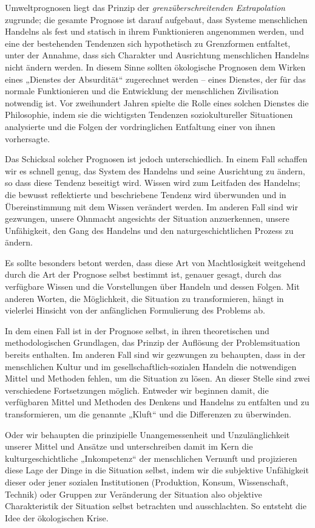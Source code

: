 \documentclass[11pt,a4paper]{article}
\begin{document}
Umweltprognosen liegt das Prinzip der \emph{grenzüberschreitenden
  Extrapolation} zugrunde; die gesamte Prognose ist darauf aufgebaut, dass
Systeme menschlichen Handelns als fest und statisch in ihrem Funktionieren
angenommen werden, und eine der bestehenden Tendenzen sich hypothetisch zu
Grenzformen entfaltet, unter der Annahme, dass sich Charakter und Ausrichtung
menschlichen Handelns nicht ändern werden. In diesem Sinne sollten ökologische
Prognosen dem Wirken eines „Dienstes der Absurdität“ zugerechnet werden --
eines Dienstes, der für das normale Funktionieren und die Entwicklung der
menschlichen Zivilisation notwendig ist. Vor zweihundert Jahren spielte die
Rolle eines solchen Dienstes die Philosophie, indem sie die wichtigsten
Tendenzen soziokultureller Situationen analysierte und die Folgen der
vordringlichen Entfaltung einer von ihnen vorhersagte.

Das Schicksal solcher Prognosen ist jedoch unterschiedlich. In einem Fall
schaffen wir es schnell genug, das System des Handelns und seine Ausrichtung
zu ändern, so dass diese Tendenz beseitigt wird. Wissen wird zum Leitfaden des
Handelns; die bewusst reflektierte und beschriebene Tendenz wird überwunden
und in Übereinstimmung mit dem Wissen verändert werden. Im anderen Fall sind
wir gezwungen, unsere Ohnmacht angesichts der Situation anzuerkennen, unsere
Unfähigkeit, den Gang des Handelns und den naturgeschichtlichen Prozess zu
ändern.

Es sollte besonders betont werden, dass diese Art von Machtlosigkeit
weitgehend durch die Art der Prognose selbst bestimmt ist, genauer gesagt,
durch das verfügbare Wissen und die Vorstellungen über Handeln und dessen
Folgen. Mit anderen Worten, die Möglichkeit, die Situation zu transformieren,
hängt in vielerlei Hinsicht von der anfänglichen Formulierung des Problems ab.

In dem einen Fall ist in der Prognose selbst, in ihren theoretischen und
methodologischen Grundlagen, das Prinzip der Auf\-lösung der Problemsituation
bereits enthalten. Im anderen Fall sind wir gezwungen zu behaupten, dass in
der menschlichen Kultur und im gesellschaft\-lich-sozialen Handeln die
notwendigen Mittel und Methoden fehlen, um die Situation zu lösen. An dieser
Stelle sind zwei verschiedene Fortsetzungen möglich. Entweder wir beginnen
damit, die verfügbaren Mittel und Methoden des Denkens und Handelns zu
entfalten und zu transformieren, um die genannte „Kluft“ und die Differenzen
zu überwinden.

Oder wir behaupten die prinzipielle Unangemessenheit und Unzulänglichkeit
unserer Mittel und Ansätze und unterschreiben damit im Kern die
kulturgeschichtliche „Inkompetenz“ der menschlichen Vernunft und projizieren
diese Lage der Dinge in die Situation selbst, indem wir die subjektive
Unfähigkeit dieser oder jener sozialen Institutionen (Produktion, Konsum,
Wissenschaft, Technik) oder Gruppen zur Veränderung der Situation also
objektive Charakteristik der Situation selbst betrachten und ausschlachten.
So entsteht die Idee der ökologischen Krise.
\end{document}
